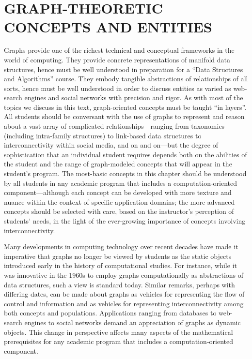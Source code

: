 
\chapter{GRAPH-THEORETIC CONCEPTS AND ENTITIES}
\label{Ch:Graphs-Trees}

Graphs provide one of the richest technical and conceptual frameworks
in the world of computing.  They provide concrete representations of
manifold data structures, hence must be well understood in preparation
for a ``Data Structures and Algorithms'' course.  They embody tangible
abstractions of relationships of all sorts, hence must be well
understood in order to discuss entities as varied as web-search
engines and social networks with precision and rigor.  As with most of
the topics we discuss in this text, graph-oriented concepts must be
taught ``in layers''.  All students should be conversant with the use
of graphs to represent and reason about a vast array of complicated
relationships---ranging from taxonomies (including intra-family
structures) to link-based data structures to interconnectivity within
social media, and on and on---but the degree of sophistication that an
individual student requires depends both on the abilities of the
student and the range of graph-modeled concepts that will appear in
the student's program.  The most-basic concepts in this chapter should
be understood by all students in any academic program that includes a
computation-oriented component---although each concept can be
developed with more texture and nuance within the context of specific
application domains; the more advanced concepts should be selected
with care, based on the instructor's perception of students' needs, in
the light of the ever-growing importance of concepts involving
interconnectivity.

Many developments in computing technology over recent decades have
made it imperative that graphs no longer be viewed by students as the
static objects introduced early in the history of computational
studies.  For instance, while it was innovative in the 1960s to employ
graphs computationally as abstractions of data structures, such a view
is standard today.  Similar remarks, perhaps with differing dates, can
be made about graphs as vehicles for representing the flow of control
and information and as vehicles for representing interconnectivity
among both concepts and populations.  Applications ranging from
databases to web-search engines to social networks demand an
appreciation of graphs as dynamic objects.  This change in perspective
affects many aspects of the mathematical prerequisites for any
academic program that includes a computation-oriented component.


